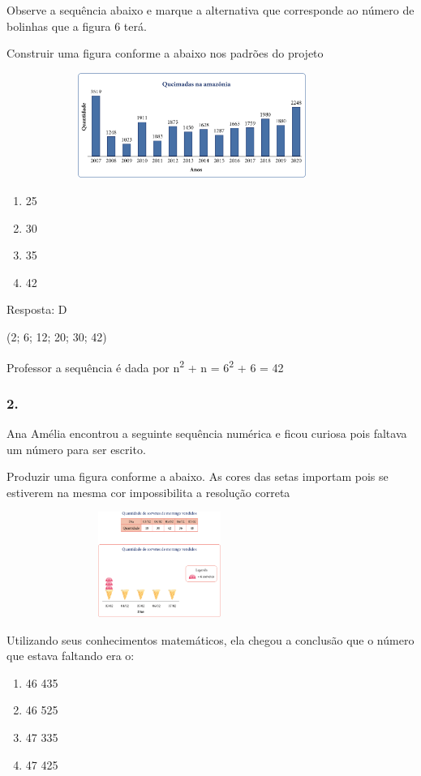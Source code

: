 Observe a sequência abaixo e marque a alternativa que corresponde ao
número de bolinhas que a figura 6 terá.

Construir uma figura conforme a abaixo nos padrões do projeto

\includegraphics[width=4.75875in,height=1.35012in]{media/image46.png}

\begin{enumerate}
\def\labelenumi{\alph{enumi})}
\item
  25
\item
  30
\item
  35
\item
  42
\end{enumerate}

Resposta: D

(2; 6; 12; 20; 30; 42)

Professor a sequência é dada por n\textsuperscript{2} + n =
6\textsuperscript{2} + 6 = 42

\subsubsection{2.}\label{section-37}

Ana Amélia encontrou a seguinte sequência numérica e ficou curiosa pois
faltava um número para ser escrito.

Produzir uma figura conforme a abaixo. As cores das setas importam pois
se estiverem na mesma cor impossibilita a resolução correta

\includegraphics[width=3.92534in,height=1.35012in]{media/image47.png}

Utilizando seus conhecimentos matemáticos, ela chegou a conclusão que o
número que estava faltando era o:

\begin{enumerate}
\def\labelenumi{\alph{enumi})}
\item
  46 435
\item
  46 525
\item
  47 335
\item
  47 425
\end{enumerate}

